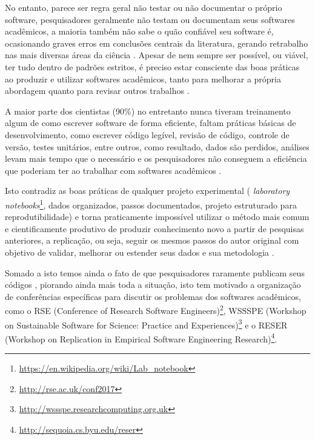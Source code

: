No entanto, parece ser regra geral não testar ou não documentar o próprio
software, pesquisadores geralmente não testam ou documentam seus softwares
acadêmicos, a maioria também não sabe o quão confiável seu software é,
ocasionando graves erros em conclusões centrais da literatura,
gerando retrabalho nas mais diversas áreas da ciência \cite{Merali2010Computational}.
Apesar de nem sempre ser possível, ou viável, ter tudo dentro de
padrões estritos, é preciso estar consciente das boas práticas ao
produzir e utilizar softwares acadêmicos, tanto para melhorar a própria
abordagem quanto para revisar outros trabalhos \cite{wilson2014best}.

A maior parte dos cientistas (90\%) no entretanto nunca tiveram treinamento
algum de como escrever software de forma eficiente, faltam práticas básicas de
desenvolvimento, como escrever código legível, revisão de código, controle de
versão, testes unitários, entre outros, como resultado, dados são perdidos,
análises levam mais tempo que o necessário e os pesquisadores não conseguem a
eficiência que poderiam ter ao trabalhar com softwares acadêmicos
\cite{wilson2017good}.

Isto contradiz as boas práticas de qualquer projeto experimental ({\it
laboratory
notebooks}\footnote{\url{https://en.wikipedia.org/wiki/Lab_notebook}}, dados
organizados, passos documentados, projeto estruturado para reprodutibilidade) e
torna praticamente impossível utilizar o método mais comum e cientificamente
produtivo de produzir conhecimento novo a partir de pesquisas anteriores, a
replicação, ou seja, seguir os mesmos passos do autor original com objetivo de
validar, melhorar ou estender seus dados e sua metodologia
\cite{king1995replication, Stodden2010}.

Somado a isto temos ainda o fato de que pesquisadores raramente publicam seus
códigos \cite{robles2010replicating, amann2015software}, piorando ainda mais
toda a situação, isto tem motivado a organização de conferências específicas
para discutir os problemas dos softwares acadêmicos, como o RSE (Conference of
Research Software Engineers)\footnote{ \url{http://rse.ac.uk/conf2017}}, WSSSPE
(Workshop on Sustainable Software for Science: Practice and
Experiences)\footnote{ \url{http://wssspe.researchcomputing.org.uk}} e o RESER
(Workshop on Replication in Empirical Software Engineering Research)\footnote{
\url{http://sequoia.cs.byu.edu/reser}}.


